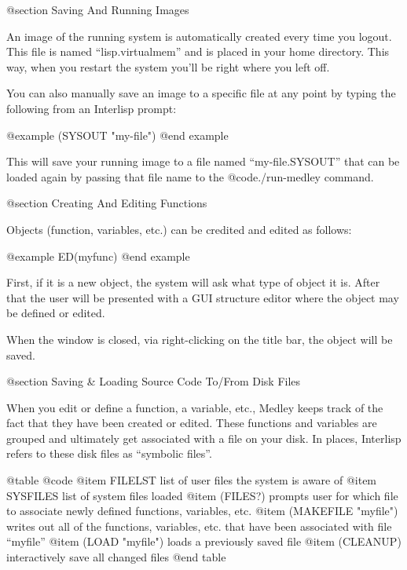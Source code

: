 @section Saving And Running Images

An image of the running system is automatically created every time you
logout.  This file is named ``lisp.virtualmem'' and is placed in your
home directory.  This way, when you restart the system you'll be right
where you left off.

You can also manually save an image to a specific file at any point by
typing the following from an Interlisp prompt:

@example
(SYSOUT "my-file")
@end example

This will save your running image to a file named ``my-file.SYSOUT''
that can be loaded again by passing that file name to the
@code{./run-medley} command.

@section Creating And Editing Functions

Objects (function, variables, etc.) can be credited and edited
as follows:

@example
ED(myfunc)
@end example

First, if it is a new object, the system will ask what type of object
it is.  After that the user will be presented with a GUI structure editor
where the object may be defined or edited.

When the window is closed, via right-clicking on the title bar,
the object will be saved.



@section Saving & Loading Source Code To/From Disk Files

When you edit or define a function, a variable, etc., Medley keeps
track of the fact that they have been created or edited.  These
functions and variables are grouped and ultimately get associated with
a file on your disk.  In places, Interlisp refers to these disk files
as ``symbolic files''.

@table @code
@item FILELST
list of user files the system is aware of
@item SYSFILES
list of system files loaded
@item (FILES?)
prompts user for which file to associate newly defined functions,
variables, etc.
@item (MAKEFILE "myfile")
writes out all of the functions, variables, etc. that have been
associated with file ``myfile''
@item (LOAD "myfile")
loads a previously saved file
@item (CLEANUP)
interactively save all changed files
@end table
